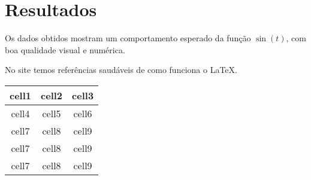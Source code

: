 \section{Resultados}
Os dados obtidos mostram um comportamento esperado da função $\sin(t)$, com boa qualidade visual e numérica.

No site \cite{site-latex} temos referências saudáveis de como funciona o \LaTeX.

\begin{center}
    \begin{tabular}{ |c|c|c| }
        \hline
        \textbf{cell1} & \textbf{cell2} & \textbf{cell3} \\
        \hline
        cell4 & cell5 & cell6 \\
        cell7 & cell8 & cell9 \\
        cell7 & cell8 & cell9 \\
        cell7 & cell8 & cell9 \\
        \hline
    \end{tabular}
\end{center}